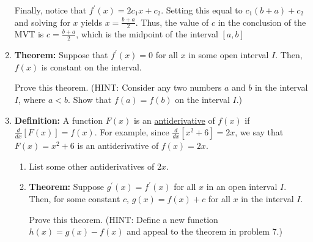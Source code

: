 \documentclass[12pt]{article}
\newif\ifans
\begin{document}
\begin{enumerate}
{{{Finally, notice that $f^{\prime}(x)=2c_1x+c_2$.  Setting this equal to $c_1(b+a)+c_2$ and solving for $x$ yields $x=\frac{b+a}{2}$.  Thus, the value of $c$ in the conclusion of the MVT is $c=\frac{b+a}{2}$, which is the midpoint of the interval $[a,b]$}}}\fi

\item {\bf Theorem:} Suppose that $f^{\prime}(x)=0$ for all $x$ in some open interval $I$.  Then, $f(x)$ is constant on the interval.

Prove this theorem. (HINT: Consider any two numbers $a$ and $b$ in the interval $I$, where $a<b$.  Show that $f(a)=f(b)$ on the interval $I$.)

\ifans{\fbox{\parbox{1\linewidth}{Pick any two numbers $a$ and $b$ in the interval $I$, where $a<b$.  Since, by assumption,  $f(x)$ is differentiable for all $x$ in $I$, we have the following:
\begin{itemize}
\item $f(x)$ is continuous on $[a,b]$
\item $f(x)$ is differentiable on $(a,b)$
\end{itemize}
Therefore, by the Mean Value Theorem, there exists a number $c$ in $(a,b)$ such that $$f^{\prime}(c)=\frac{f(b)-f(a)}{b-a}$$  But, $f^{\prime}(x)=0$ for all x in the interval $I$; so, in particular, $f^{\prime}(c)=0$.  Thus, it follows that $f(b)-f(a)=0 \implies f(b)=f(a)$.  In other words, $f(x)$ is constant on the interval $I$.}}} \fi

\item {\bf Definition:} A function $F(x)$ is an \underline{antiderivative} of $f(x)$ if $\frac{d}{dx}\left[F(x)\right]=f(x)$.  For example, since $\frac{d}{dx}\left[x^2+6\right]=2x$, we say that $F(x)=x^2+6$ is an antiderivative of $f(x)=2x$.

\begin{enumerate}

\item List some other antiderivatives of $2x$.

\ifans{\fbox{All antiderivatives of $2x$ have the form $x^2+C$, where $C$ is any constant.}} \fi

\item {\bf Theorem:} Suppose $g^{\prime}(x)=f^{\prime}(x)$ for all $x$ in an open interval $I$.  Then, for some constant $c$, $g(x)=f(x)+c$ for all $x$ in the interval $I$.

Prove this theorem.  (HINT: Define a new function $h(x)=g(x)-f(x)$ and appeal to the theorem in problem 7.)


\end{enumerate}
\end{enumerate}
\end{document}
